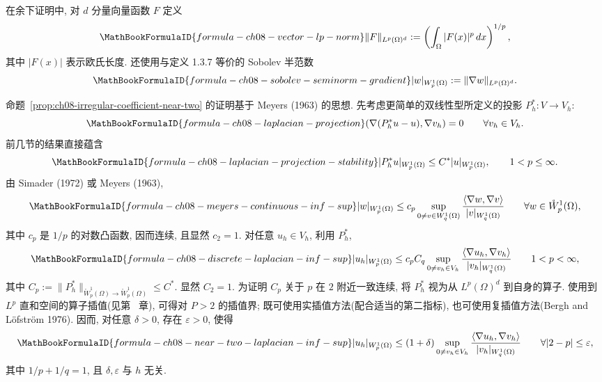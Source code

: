 在余下证明中, 对 $d$ 分量向量函数 $F$ 定义
\[
\MathBookFormulaID{formula-ch08-vector-lp-norm}
\|F\|_{L^p(\Omega)^d}:=\left(\int_\Omega|F(x)|^p\,dx\right)^{1/p},
\]
其中 $|F(x)|$ 表示欧氏长度. 还使用与定义 1.3.7 等价的 Sobolev 半范数
\[
\MathBookFormulaID{formula-ch08-sobolev-seminorm-gradient}
|w|_{W_p^1(\Omega)}:=\|\nabla w\|_{L^p(\Omega)^d}.
\]

命题~\ref{prop:ch08-irregular-coefficient-near-two} 的证明基于 Meyers (1963) 的思想. 先考虑更简单的双线性型所定义的投影 $P_h^*:V\to V_h$:
\[
\MathBookFormulaID{formula-ch08-laplacian-projection}
(\nabla(P_h^*u-u),\nabla v_h)=0
\qquad\forall v_h\in V_h.
\]
前几节的结果直接蕴含
\begin{equation}
\MathBookFormulaID{formula-ch08-laplacian-projection-stability}
\label{eq:ch08-laplacian-projection-stability}
|P_h^*u|_{W_p^1(\Omega)}\leq C^*|u|_{W_p^1(\Omega)},
\qquad1<p\leq\infty.
\end{equation}
由 Simader (1972) 或 Meyers (1963),
\begin{equation}
\MathBookFormulaID{formula-ch08-meyers-continuous-inf-sup}
\label{eq:ch08-meyers-continuous-inf-sup}
|w|_{W_p^1(\Omega)}\leq c_p\sup_{0\neq v\in W_q^1(\Omega)}
\frac{\langle\nabla w,\nabla v\rangle}{|v|_{W_q^1(\Omega)}}
\qquad\forall w\in\mathring W_p^1(\Omega),
\end{equation}
其中 $c_p$ 是 $1/p$ 的对数凸函数, 因而连续, 且显然 $c_2=1$. 对任意 $u_h\in V_h$, 利用 $P_h^*$,
\begin{equation}
\MathBookFormulaID{formula-ch08-discrete-laplacian-inf-sup}
\label{eq:ch08-discrete-laplacian-inf-sup}
|u_h|_{W_p^1(\Omega)}
\leq c_pC_q\sup_{0\neq v_h\in V_h}
\frac{\langle\nabla u_h,\nabla v_h\rangle}{|v_h|_{W_q^1(\Omega)}}
\qquad1<p<\infty,
\end{equation}
其中 $C_p:=\|P_h^*\|_{\mathring W_p^1(\Omega)\to\mathring W_p^1(\Omega)}\leq C^*$. 显然 $C_2=1$. 为证明 $C_p$ 关于 $p$ 在 $2$ 附近一致连续, 将 $P_h^*$ 视为从 $L^p(\Omega)^d$ 到自身的算子. 使用到 $L^p$ 直和空间的算子插值(见第~ 章), 可得对 $P>2$ 的插值界; 既可使用实插值方法(配合适当的第二指标), 也可使用复插值方法(Bergh and Löfström 1976). 因而, 对任意 $\delta>0$, 存在 $\varepsilon>0$, 使得
\begin{equation}
\MathBookFormulaID{formula-ch08-near-two-laplacian-inf-sup}
\label{eq:ch08-near-two-laplacian-inf-sup}
|u_h|_{W_p^1(\Omega)}\leq(1+\delta)
\sup_{0\neq v_h\in V_h}\frac{\langle\nabla u_h,\nabla v_h\rangle}{|v_h|_{W_q^1(\Omega)}}
\qquad\forall|2-p|\leq\varepsilon,
\end{equation}
其中 $1/p+1/q=1$, 且 $\delta,\varepsilon$ 与 $h$ 无关.

